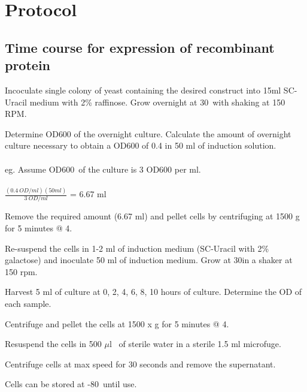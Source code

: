 \section {Protocol}
	\subsection{Time course for expression of recombinant  protein}
	\begin{packed_enum}
			\item Incoculate single colony of yeast containing the desired construct into 15ml SC-Uracil medium with 2\% raffinose. Grow overnight at 30\textcelsius \ with shaking at 150 RPM. 
			\item Determine OD{\scriptsize 600} of the overnight culture. Calculate the amount of overnight culture necessary to obtain a OD{\scriptsize 600} of 0.4 in 50 ml of induction solution.\\\\
			eg. Assume OD{\scriptsize 600}\ of the culture is 3 OD{\scriptsize600} per ml.\\ \\
			$\frac {(0.4 \ OD/ml)(50ml)}{3 \ OD/ml}$ = 6.67 ml\\
			\item Remove the required amount (6.67 ml) and pellet cells by centrifuging at 1500 g for 5 minutes @ 4\textcelsius.
			\item Re-suspend the cells in 1-2 ml of induction medium (SC-Uracil with 2\% galactose) and inoculate 50 ml of induction medium. Grow at 30\textcelsius in a shaker at 150 rpm.
			\item Harvest 5 ml of culture at 0, 2, 4, 6, 8, 10 hours of culture. Determine the OD of each sample.
			\item Centrifuge and pellet the cells at 1500 x g for 5 minutes @ 4\textcelsius.
			\item Resuspend the cells in 500 $\mu$l \ of sterile water in a sterile 1.5 ml microfuge.
			\item Centrifuge cells at max speed for 30 seconds and remove the supernatant.
			\item Cells can be stored at -80\textcelsius \ until use.			
	\end{packed_enum}
